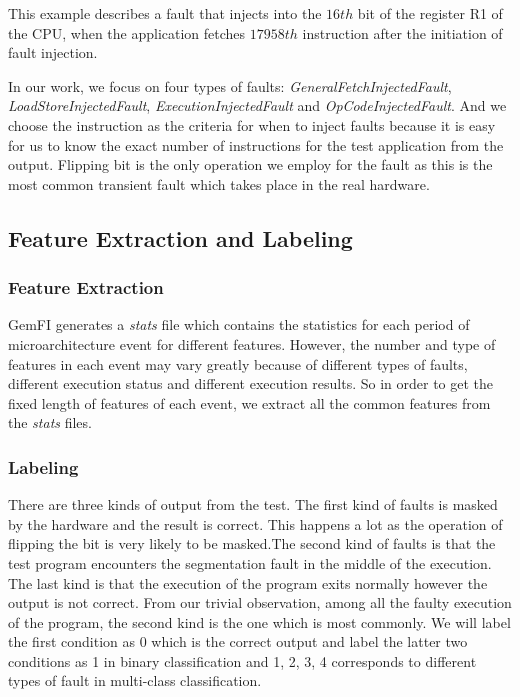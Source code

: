 This example describes a fault that injects into the $16th$ bit of the register R1 of the CPU, when the application fetches $17958th$ instruction after the initiation of fault injection. 

In our work, we focus on four types of faults: \textit{GeneralFetchInjectedFault}, \textit{LoadStoreInjectedFault}, \textit{ExecutionInjectedFault} and \textit{OpCodeInjectedFault}. And we choose the instruction as the criteria for when to inject faults because it is easy for us to know the exact number of instructions for the test application from the output. Flipping bit is the only operation we employ for the fault as this is the most common transient fault which takes place in the real hardware. 



\subsection{Feature Extraction and Labeling}\label{section:FE}
\subsubsection{Feature Extraction}
GemFI generates a \emph{stats} file which contains the statistics for each period of microarchitecture event for different features. However, the number and type of features in each event may vary greatly because of different types of faults, different execution status and different execution results. So in order to get the fixed length of features of each event, we extract all the common features from the \emph{stats} files. 
\subsubsection{Labeling}
There are three kinds of output from the test. The first kind of faults is masked by the hardware and the result is correct. This happens a lot as the operation of flipping the bit is very likely to be masked.The second kind of faults is that the test program encounters the segmentation fault in the middle of the execution. The last kind is that the execution of the program exits normally however the output is not correct. From our trivial observation, among all the faulty execution of the program, the second kind is the one which is most commonly. We will label the first condition as 0 which is the correct output and label the latter two conditions as 1 in binary classification and 1, 2, 3, 4 corresponds to different types of fault in multi-class classification.

